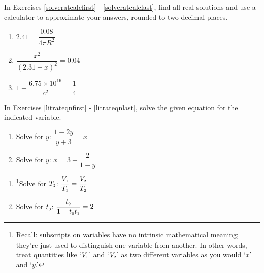 \documentclass{ximera}
\begin{document}
In Exercises \ref{solveratcalcfirst} - \ref{solveratcalclast}, find all real solutions and use a calculator to approximate your answers, rounded to two decimal places.


\begin{multicols}{3}
\begin{enumerate}
\setcounter{enumi}{\value{HW}}


\item $2.41 = \dfrac{0.08}{4 \pi R^2}$ \label{solveratcalcfirst}
\item $\dfrac{x^2}{(2.31 -x)^2} = 0.04$
\item $1 - \dfrac{6.75 \times 10^{16}}{c^2} = \dfrac{1}{4}$ \label{solveratcalclast}

\setcounter{HW}{\value{enumi}}
\end{enumerate}
\end{multicols}


\newpage

In Exercises \ref{litrateqnfirst} - \ref{litrateqnlast}, solve the given equation for the indicated variable.

\begin{multicols}{2}
\begin{enumerate}
\setcounter{enumi}{\value{HW}}


\item Solve for $y$:  $\dfrac{1-2y}{y+3} = x$ \label{litrateqnfirst}

\item Solve for $y$: $x = 3 - \dfrac{2}{1-y}$ 

\setcounter{HW}{\value{enumi}}
\end{enumerate}
\end{multicols}



\begin{multicols}{2}
\begin{enumerate}
\setcounter{enumi}{\value{HW}}

\item\hspace{-0.1in}\footnote{Recall: subscripts on variables have no intrinsic mathematical meaning; they're just used to distinguish one variable from another.  In other words, treat quantities like `$V_{\text{\tiny $1$}}$' and `$V_{\text{\tiny $2$}}$'  as two different variables as you would `$x$' and `$y$.'}Solve for $T_{\text{\tiny $2$}}$:  $\dfrac{V_{\text{\tiny $1$}}}{T_{\text{\tiny $1$}}} = \dfrac{V_{\text{\tiny $2$}}}{T_{\text{\tiny $2$}}}$


\item  Solve for $t_{\text{\tiny $0$}}$:  $\dfrac{t_{\text{\tiny $0$}}}{1-t_{\text{\tiny $0$}}t_{\text{\tiny $1$}}} = 2$ 

\setcounter{HW}{\value{enumi}}
\end{enumerate}
\end{multicols}
\end{document}
